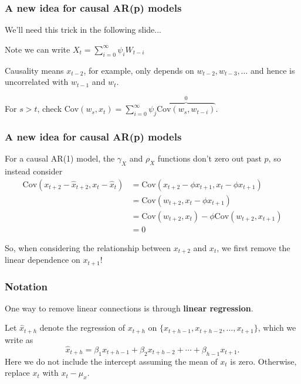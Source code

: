 \documentclass[%
xcolor=pdftex]{beamer}
\begin{document}
\begin{frame}
\frametitle{A new idea for causal AR(p) models}

We'll need this trick in the following slide...
\newline

Note we can write $X_t = \sum_{i=0}^{\infty} \psi_i W_{t-i}$
\newline

Causality means $x_{t-2}$, for example, only depends on $w_{t-2},w_{t-3},\ldots$ and hence is uncorrelated with $w_{t-1}$ and $w_t$. 

For $s > t$, check $\text{Cov}(w_{s},x_{t})= \sum_{i=0}^{\infty} \psi_j \overbrace{\text{Cov}(w_{s},w_{t-i})}^{0}$. 

\end{frame}


\begin{frame}
\frametitle{A new idea for causal AR(p) models}

For a causal AR(1) model, the $\gamma_X$ and $\rho_X$ functions don't zero out past $p$, so instead consider 
\begin{align*}
\text{Cov}(x_{t+2} - \hat{x}_{t+2},x_{t} - \hat{x}_t) &= \text{Cov}(x_{t+2} - \phi x_{t+1},x_{t} - \phi x_{t+1}) \\
&= \text{Cov}(w_{t+2}, x_{t} - \phi x_{t+1}) \\
&= \text{Cov}(w_{t+2}, x_{t}) - \phi \text{Cov}(w_{t+2}, x_{t+1}) \\
&= 0
\end{align*}

So, when considering the relationship between $x_{t+2}$ and $x_t$, we first remove the linear dependence on $x_{t+1}$!

\end{frame}

\begin{frame}
\frametitle{Notation}

One way to remove linear connections is through \textbf{linear
regression}. 
\newline

Let $\hat{x}_{t+h}$ denote the regression of $x_{t+h}$ on
$\{x_{t+h-1},x_{t+h-2},\ldots,x_{t+1}\}$, which we write as
\begin{equation}
\hat{x}_{t+h} = \beta_1 x_{t+h-1} + \beta_2 x_{t+h-2} + \cdots + \beta_{h-1} x_{t+1}.
\end{equation}
Here we do not include the intercept assuming the mean of $x_t$
is zero. Otherwise, replace $x_t$ with $x_t - \mu_x$.

\end{frame}
\end{document}
